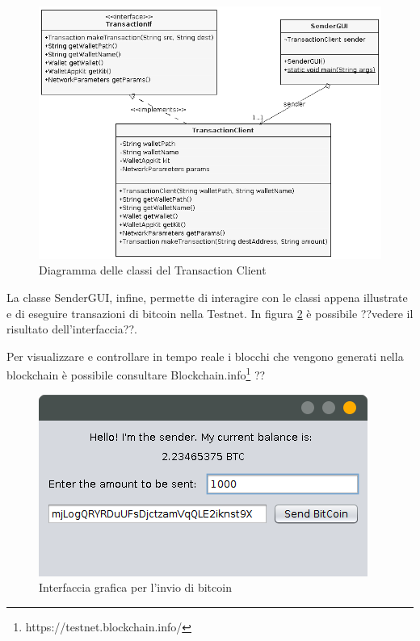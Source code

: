 \begin{figure}[h!t]
\centerline{\includegraphics[scale=2]{img/BlockchainCorrect}}
\caption{Diagramma delle classi del Transaction Client}
\label{f:integr:trxclient}
\end{figure}

La classe SenderGUI, infine, permette di interagire con le classi appena illustrate e di eseguire transazioni di bitcoin nella Testnet. In figura \ref{f:integr:gui-base} è possibile ??vedere il risultato dell'interfaccia??.

Per visualizzare e controllare in tempo reale i blocchi che vengono generati nella blockchain è possibile consultare Blockchain.info\footnote{https://testnet.blockchain.info/} ??

\begin{figure}[h!t]
\centerline{\includegraphics[width=\textwidth]{img/gui-base}}
\caption{Interfaccia grafica per l'invio di bitcoin}
\label{f:integr:gui-base}
\end{figure}


